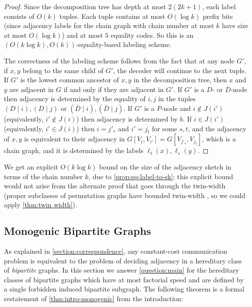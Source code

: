 \documentclass{theoretics}
\newcommand\eqLabelSep{\mathbin|}
\begin{document}
\begin{proof}
Since the decomposition tree has depth at most $2(2k+1)$, each label consists of $O(k)$ tuples.
Each tuple contains at most $O(\log k)$ prefix bits (since adjacency labels for the chain graph with
chain number at most $k$ have size at most $O(\log k)$) and at most $5$ equality codes. So this is
an $( O(k\log k), O(k) )$-equality-based labeling scheme.

The correctness of the labeling scheme follows from the fact that at any node $G'$, if $x,y$
belong to the same child of $G'$, the decoder will continue to the next tuple. If $G'$ is the
lowest common ancestor of $x,y$ in the decomposition tree, then $x$ and $y$ are adjacent in $G$
if and only if they are adjacent in $G'$. If $G'$ is a $D$- or $\overline D$-node then adjacency
is determined by the equality of $i,j$ in the tuples $(D \eqLabelSep i), (D \eqLabelSep j)$ or $(\overline D \eqLabelSep
i), (\overline D \eqLabelSep j)$. If $G'$ is a $P$-node and $i \notin J(i')$ (equivalently, $i' \notin
J(i)$) then adjacency is determined by $b$. If $i \in J(i')$ (equivalently, $i' \in J(i)$) then $i =
j'_s$ and $i' = j_t$ for some $s,t$, and the adjacency of $x,y$ is equivalent to their adjacency in
$G[V_i, V_{i'}] = G[V_{j'_s}, V_{j_t}]$, which is a chain graph, and it is determined by the
labels $\ell_t(x), \ell_s(y)$.
\end{proof}

\begin{remark}
We get an explicit $O(k \log k)$ bound on the size of the adjacency sketch in terms of the chain
number $k$, due to \cref{prop:eq-label-to-sk};
this explicit bound would not arise from the alternate proof that goes through the twin-width
(proper subclasses of permutation graphs have bounded twin-width \cite{BKTW20}, so we could apply
\cref{thm:twin width}).
\end{remark}

\subsection{Monogenic Bipartite Graphs}
\label{section:bipartite graphs}

As explained in \cref{section:correspondence}, any constant-cost communication problem is equivalent
to the problem of deciding adjacency in a hereditary class of \emph{bipartite} graphs. In this
section we answer \cref{question:main} for the hereditary classes of bipartite graphs which have at
most factorial speed and are defined by a single forbidden induced bipartite subgraph.
The following theorem is a formal restatement of \cref{thm:intro-monogenic} from the introduction:
\end{document}
